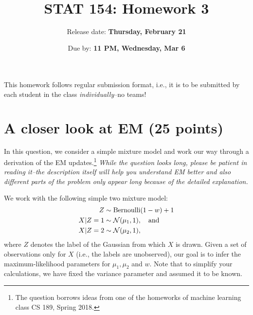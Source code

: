 \documentclass[11pt]{article}
\title{STAT 154: Homework 3}
\author{Release date: \textbf{Thursday, February 21}}
\date{Due by: \textbf{11 PM, Wednesday, Mar 6}}
\begin{document}
\maketitle

This homework follows regular submission format, i.e., it is to be
submitted by each student in the class \emph{individually}--no teams!

\section{A closer look at EM (25 points)}

In this question, we consider a simple mixture  model and work our way through
a derivation of the EM updates.\footnote{The question borrows ideas
from one of the homeworks of machine learning class CS 189, Spring 2018.}
\emph{While the question looks long, please be patient in reading it--the
description itself will help you understand EM better and also different
parts of the problem only appear long because of the detailed explanation.}

We work with the following simple two mixture model:
\begin{align}
  Z &\sim \text{Bernoulli}(1-w)+1\notag\\
  X\vert Z=1 &\sim \mathcal{N}(\mu_1, 1), \quad \text{and}\notag\\
  X\vert Z=2 &\sim \mathcal{N}(\mu_2, 1),
  \label{eq:model}
\end{align}
where $Z$ denotes the label of the Gaussian from which $X$ is drawn.
Given a set of observations only for $X$ (i.e., the labels are unobserved), 
our goal is to infer the maximum-likelihood parameters for $\mu_1, \mu_2
$ and $w$. Note that to simplify your calculations, we have fixed the variance
parameter and assumed it to be known.
\end{document}
